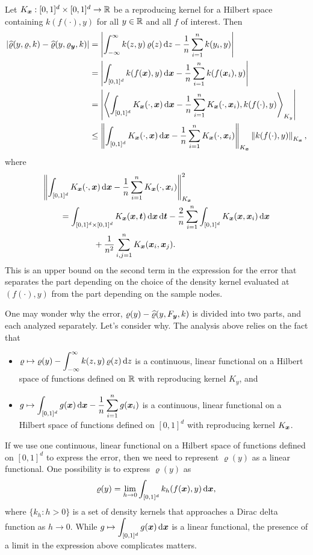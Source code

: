 \documentclass[letterpaper]{amsart}
\newcommand{\hvarrho}{\widehat{\varrho}}
\newcommand{\KY}{K_y}
\newcommand{\KX}{K_{\vx}}
\begin{document}
Let $\KX: [0,1]^d \times [0,1]^d\to \reals$ be a reproducing kernel for a Hilbert space containing $k(f(\cdot),y)$ for all $y \in \mathbb{R}$ and all $f$ of interest. Then
\begin{align*}
\abs{\hvarrho(y,\varrho,k) - \hvarrho(y,\varrho_{\vy},k)}
& = \abs{\int_{-\infty}^{\infty} k(z,y) \, \varrho(z) \, \dif z -
\frac 1n \sum_{i=1}^n k(y_i,y)} \\
& = \abs{\int_{[0,1]^d} k(f(\vx),y) \, \dif \vx -
\frac 1n \sum_{i=1}^n k(f(\vx_i),y)} \\
& = \abs{\ip[\KY]{\int_{[0,1]^d} \KX(\cdot,\vx) \, \dif \vx -
\frac 1n \sum_{i=1}^n \KX(\cdot,\vx_i)}{k(f(\cdot),y) }} \\
& \le  \norm[\KX]{\int_{[0,1]^d} \KX(\cdot,\vx) \, \dif \vx -
\frac 1n \sum_{i=1}^n \KX(\cdot,\vx_i)} \norm[\KX]{k(f(\cdot),y) } ,
\end{align*}
where
\begin{align*}
\MoveEqLeft{\norm[\KX]{\int_{[0,1]^d} \KX(\cdot,\vx) \, \dif \vx -
\frac 1n \sum_{i=1}^n \KX(\cdot,\vx_i)}^2} \\
&=  \int_{[0,1]^d \times [0,1]^d} \KX(\vx,\vt) \, \dif \vx \, \dif \vt -
\frac 2n \sum_{i=1}^n \int_{[0,1]^d} \KX(\vx,\vx_i) \, \dif \vx \\
& \qquad \qquad + \frac 1{n^2} \sum_{i,j=1}^n  \KX(\vx_i,\vx_j) .
\end{align*}
This is an upper bound on the second term in the expression for the error that separates the part depending on the choice of the density kernel evaluated at $(f(\cdot),y)$ from the part depending on the sample nodes.

One may wonder why the error, $\varrho(y) - \hvarrho(y,F_{\vy},k)$ is divided into two parts, and each analyzed separately.  Let's consider why.  The analysis above relies on the fact that
\begin{itemize}
	\item $\displaystyle \varrho \mapsto \varrho(y) - \int_{-\infty}^{\infty} k(z,y) \, \varrho(z) \, {\rm d} z$ is a continuous, linear functional on a Hilbert space of functions defined on $\mathbb{R}$ with reproducing kernel $\KY$, and
	\item $\displaystyle g \mapsto \int_{[0,1]^d} g(\boldsymbol{x}) \, {\rm d} \boldsymbol{x} -
	\frac 1n \sum_{i=1}^n g(\boldsymbol{x}_i)$ is a continuous, linear functional on a Hilbert space of functions defined on $[0,1]^d$ with reproducing kernel $\KX$.
\end{itemize}

If we use one continuous, linear functional on a Hilbert space of functions defined on $[0,1]^d$ to express the error, then we need to represent $\varrho(y)$ as a linear functional.  One possibility is to express $\varrho(y)$ as
\begin{equation*}
	\varrho(y) = \lim_{h \to 0} \int_{[0,1]^d} k_h(f(\boldsymbol{x}),y) \,  {\rm d} \boldsymbol{x},
\end{equation*}
where $\{k_h : h >0\}$ is a set of density kernels that approaches a Dirac delta function as $h \to 0$.  While $\displaystyle g \mapsto \int_{[0,1]^d} g(\boldsymbol{x}) \, {\rm d} \boldsymbol{x}$ is a linear functional, the presence of a limit in the expression above complicates matters.
\end{document}
